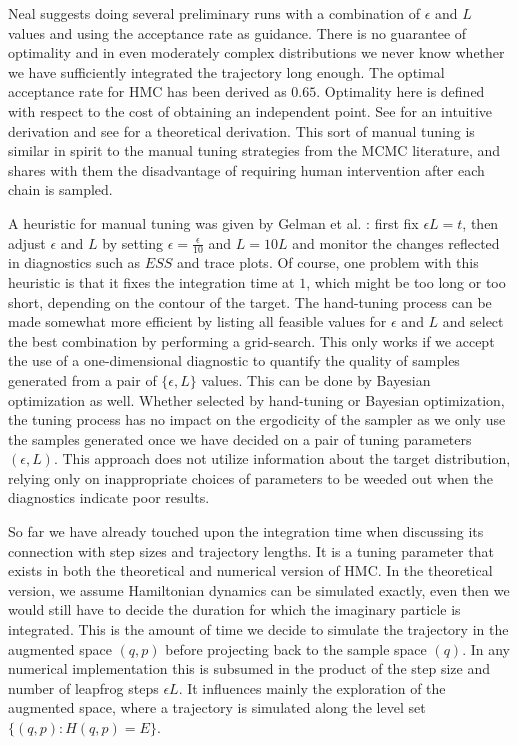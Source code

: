 \documentclass[12pt]{report}
\begin{document}
Neal \cite{neal2012bayesian} suggests doing several preliminary runs with a combination of $\epsilon$ and $L$ values and using the acceptance rate as guidance. There is no guarantee of optimality and in even moderately complex distributions we never know whether we have sufficiently integrated the trajectory long enough. The optimal acceptance rate for HMC has been derived as $0.65$. Optimality here is defined with respect to the cost of obtaining an independent point. See \cite{neal2011mcmc} for an intuitive derivation and see \cite{beskos2013optimal} for a theoretical derivation. This sort of manual tuning is similar in spirit to the manual tuning strategies from the MCMC literature, and shares with them the disadvantage of requiring human intervention after each chain is sampled. 

A heuristic for manual tuning was given by Gelman et al.
\cite{gelman2014bayesian}: first fix $\epsilon L = t$, then adjust $\epsilon$
and $L$ by setting $\epsilon = \frac{\epsilon}{10} $ and $L = 10L$ and monitor the
changes reflected in diagnostics such as $ESS$ and trace plots. Of course, one
problem with this heuristic is that it fixes the integration time at $1$, which
might be too long or too short, depending on the contour of the target. The hand-tuning process can be made somewhat more efficient by listing all feasible values
for $\epsilon$ and $L$ and select the best combination by performing a grid-search. This only works if we accept
the use of a one-dimensional diagnostic to quantify the quality of samples
generated from a pair of $\{\epsilon,L\}$ values. This can be done by Bayesian
optimization as well. Whether selected by hand-tuning or Bayesian optimization,
the tuning process has no impact on the ergodicity of the sampler as we only
use the samples generated once we have decided on a pair of tuning parameters
$(\epsilon,L)$. This approach does not utilize information about the target
distribution, relying only on inappropriate choices of parameters to be weeded
out when the diagnostics indicate poor results.


So far we have already touched upon the integration time when discussing
its connection with step sizes and trajectory lengths. It is a tuning parameter
that exists in both the theoretical and numerical version of HMC. In the
theoretical version, we assume Hamiltonian dynamics can be simulated exactly,
even then we would still have to decide the duration for which the imaginary
particle is integrated. This
is the amount of time we decide to simulate the trajectory in the augmented
space $(q,p)$ before projecting back to the sample space $(q)$. In any
numerical implementation this is subsumed in the product of the step size and 
number of leapfrog steps $\epsilon L$. It influences mainly the exploration of
the augmented space, where a trajectory is simulated along the level set
$\{(q,p):H(q,p)=E\}$.
\end{document}
